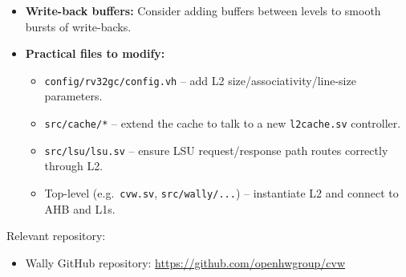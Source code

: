\documentclass[11pt]{article}
\begin{document}
\begin{itemize}
  \item \textbf{Write-back buffers:} Consider adding buffers between levels to smooth bursts of write-backs.
  \item \textbf{Practical files to modify:}
        \begin{itemize}
          \item \texttt{config/rv32gc/config.vh} -- add L2 size/associativity/line-size parameters.
          \item \texttt{src/cache/*} -- extend the cache to talk to a new \texttt{l2cache.sv} controller.
          \item \texttt{src/lsu/lsu.sv} -- ensure LSU request/response path routes correctly through L2.
          \item Top-level (e.g.\ \texttt{cvw.sv}, \texttt{src/wally/...}) -- instantiate L2 and connect to AHB and L1s.
        \end{itemize}
\end{itemize}

Relevant repository:
\begin{itemize}
  \item Wally GitHub repository: \url{https://github.com/openhwgroup/cvw}
\end{itemize}
\end{document}
